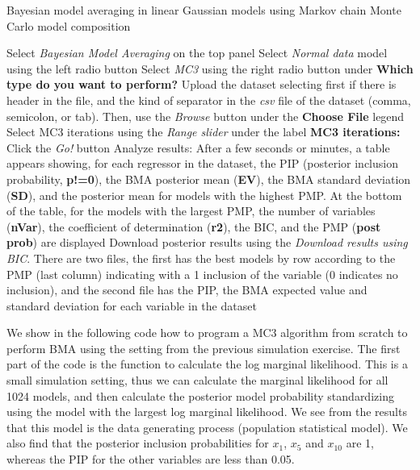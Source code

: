 \begin{algorithm}[h!]
	\caption{Bayesian model averaging in linear Gaussian models using Markov chain Monte Carlo model composition}\label{alg:BMAnormalMC3}
	\begin{algorithmic}[1]  		 			
		\State Select \textit{Bayesian Model Averaging} on the top panel
		\State Select \textit{Normal data} model using the left radio button
		\State Select \textit{MC3} using the right radio button under \textbf{Which type do you want to perform?}
		\State Upload the dataset selecting first if there is header in the file, and the kind of separator in the \textit{csv} file of the dataset (comma, semicolon, or tab). Then, use the \textit{Browse} button under the \textbf{Choose File} legend
		\State Select MC3 iterations using the \textit{Range slider} under the label \textbf{MC3 iterations:}
		\State Click the \textit{Go!} button
		\State Analyze results: After a few seconds or minutes, a table appears showing, for each regressor in the dataset, the PIP (posterior inclusion probability, \textbf{p!=0}), the BMA posterior mean (\textbf{EV}), the BMA standard deviation (\textbf{SD}), and the posterior mean for models with the highest PMP. At the bottom of the table, for the models with the largest PMP, the number of variables (\textbf{nVar}), the coefficient of determination (\textbf{r2}), the BIC, and the PMP (\textbf{post prob}) are displayed
		\State Download posterior results using the \textit{Download results using BIC}. There are two files, the first has the best models by row according to the PMP (last column) indicating with a 1 inclusion of the variable (0 indicates no inclusion), and the second file has the PIP, the BMA expected value and standard deviation for each variable in the dataset
	\end{algorithmic} 
\end{algorithm}

We show in the following code how to program a MC3 algorithm from scratch to perform BMA using the setting from the previous simulation exercise. The first part of the code is the function to calculate the log marginal likelihood. This is a small simulation setting, thus we can calculate the marginal likelihood for all 1024 models, and then calculate the posterior model probability standardizing using the model with the largest log marginal likelihood. We see from the results that this model is the data generating process (population statistical model). We also find that the posterior inclusion probabilities for $x_{1}$, $x_{5}$ and $x_{10}$ are 1, whereas the PIP for the other variables are less than 0.05. 

